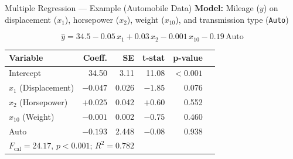 \documentclass[12pt, aspectratio=169]{beamer}
\begin{document}
    \begin{frame}{Multiple Regression --- Example (Automobile Data)}
        \textbf{Model:} Mileage ($y$) on displacement ($x_1$), horsepower ($x_2$), weight ($x_{10}$), and transmission type (\texttt{Auto})

        \[
            \hat{y} = 34.5 - 0.05\,x_1 + 0.03\,x_2 - 0.001\,x_{10} - 0.19\,\text{Auto}
        \]

        \begin{center}
            \small
            \begin{tabular}{lrrrrr}
                \toprule
                \textbf{Variable} & \textbf{Coeff.} & \textbf{SE} & \textbf{t-stat} &
                    \textbf{p-value} \\
                \midrule
                Intercept   &  34.50 & 3.11 & 11.08 & $< 0.001$ \\
                $x_1$ (Displacement) & $-0.047$ & 0.026 & $-1.85$ & 0.076 \\
                $x_2$ (Horsepower)   & $+0.025$ & 0.042 & $+0.60$ & 0.552 \\
                $x_{10}$ (Weight)    & $-0.001$ & 0.002 & $-0.75$ & 0.460 \\
                Auto                 & $-0.193$ & 2.448 & $-0.08$ & 0.938 \\
                \midrule
                \multicolumn{4}{l}{$F_{\text{cal}} = 24.17$, $p < 0.001$;
                    \quad $R^2 = 0.782$} \\
                \bottomrule
            \end{tabular}
        \end{center}
    \end{frame}
\end{document}
